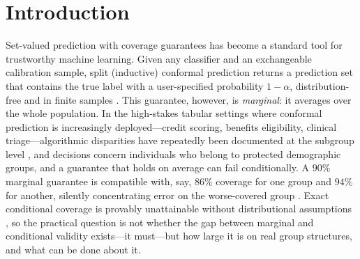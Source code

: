 \documentclass[review,12pt]{elsarticle}
\begin{document}
\linenumbers

\section{Introduction}
\label{sec:intro}

Set-valued prediction with coverage guarantees has become a standard tool for trustworthy machine learning. Given any classifier and an exchangeable calibration sample, split (inductive) conformal prediction returns a prediction set that contains the true label with a user-specified probability $1-\alpha$, distribution-free and in finite samples \cite{vovk2005,papadopoulos2002,shafer2008,angelopoulos2023,fontana2023}. This guarantee, however, is \emph{marginal}: it averages over the whole population. In the high-stakes tabular settings where conformal prediction is increasingly deployed---credit scoring, benefits eligibility, clinical triage---algorithmic disparities have repeatedly been documented at the subgroup level \cite{obermeyer2019,chouldechova2017}, and decisions concern individuals who belong to protected demographic groups, and a guarantee that holds on average can fail conditionally. A $90\%$ marginal guarantee is compatible with, say, $86\%$ coverage for one group and $94\%$ for another, silently concentrating error on the worse-covered group \cite{romano2020eq}. Exact conditional coverage is provably unattainable without distributional assumptions \cite{vovk2012,barber2021limits}, so the practical question is not whether the gap between marginal and conditional validity exists---it must---but how large it is on real group structures, and what can be done about it.
\end{document}
